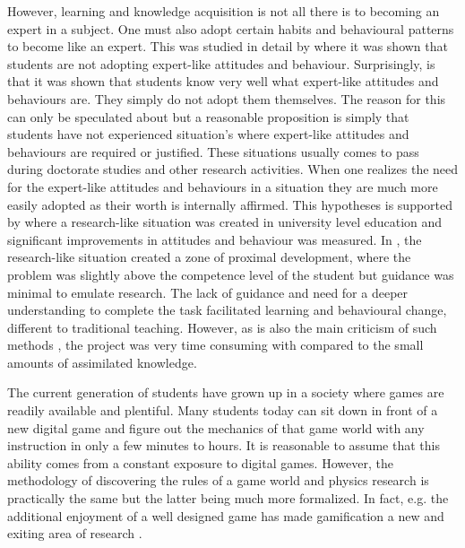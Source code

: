 \documentclass[11pt, twocolumn]{article}
\begin{document}
However, learning and knowledge acquisition is not all there is to becoming an expert in a subject. One must also adopt certain habits and behavioural patterns to become like an expert. This was studied in detail by \citet{adams2006new} where it was shown that students are not adopting expert-like attitudes and behaviour. Surprisingly, is that it was shown that students know very well what expert-like attitudes and behaviours are. They simply do not adopt them themselves. The reason for this can only be speculated about but a reasonable proposition is simply that students have not experienced situation's where expert-like attitudes and behaviours are required or justified. These situations usually comes to pass during doctorate studies and other research activities. When one realizes the need for the expert-like attitudes and behaviours in a situation they are much more easily adopted as their worth is internally affirmed. This hypotheses is supported by \citet{kapon2016doing} where a research-like situation was created in university level education and significant improvements in attitudes and behaviour was measured. In \citet{kapon2016doing}, the research-like situation created a zone of proximal development, where the problem was slightly above the competence level of the student but guidance was minimal to emulate research. The lack of guidance and need for a deeper understanding to complete the task facilitated learning and behavioural change, different to traditional teaching. However, as is also the main criticism of such methods \citep{hner2006minimal}, the project was very time consuming with compared to the small amounts of assimilated knowledge. 

The current generation of students have grown up in a society where games are readily available and plentiful. Many students today can sit down in front of a new digital game and figure out the mechanics of that game world with any instruction in only a few minutes to hours. It is reasonable to assume that this ability comes from a constant exposure to digital games. However, the methodology of discovering the rules of a game world and physics research is practically the same but the latter being much more formalized. In fact, e.g. the additional enjoyment of a well designed game has made gamification a new and exiting area of research \citep{dicheva2015gamification}. 
\end{document}

